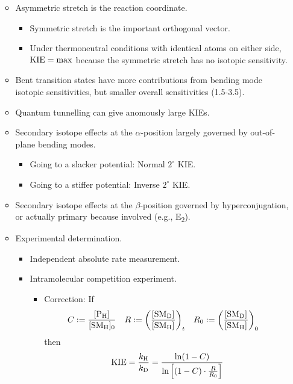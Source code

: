 \documentclass[../notes.tex]{subfiles}
\begin{document}
\begin{itemize}
\begin{itemize}
\begin{equation*}
        \end{equation*}
        \item Asymmetric stretch is the reaction coordinate.
        \begin{itemize}
            \item Symmetric stretch is the important orthogonal vector.
            \item Under thermoneutral conditions with identical atoms on either side, $\operatorname{KIE}=\max$ because the symmetric stretch has no isotopic sensitivity.
        \end{itemize}
        \item Bent transition states have more contributions from bending mode isotopic sensitivities, but smaller overall sensitivities (1.5-3.5).
        \item Quantum tunnelling can give anomously large KIEs.
        \item Secondary isotope effects at the $\alpha$-position largely governed by out-of-plane bending modes.
        \begin{itemize}
            \item Going to a slacker potential: Normal $2^\circ$ KIE.
            \item Going to a stiffer potential: Inverse $2^\circ$ KIE.
        \end{itemize}
        \item Secondary isotope effects at the $\beta$-position governed by hyperconjugation, or actually primary because involved (e.g., E\textsubscript{2}).
        \item Experimental determination.
        \begin{itemize}
            \item Independent absolute rate measurement.
            \item Intramolecular competition experiment.
            \begin{itemize}
                \item Correction: If
                \begin{align*}
                    C &:= \frac{\cnc{P_H}}{\cnc[0]{SM_H}}&
                    R &:= \left( \frac{\cnc{SM_D}}{\cnc{SM_H}} \right)_t&
                    R_0 &:= \left( \frac{\cnc{SM_D}}{\cnc{SM_H}} \right)_0
                \end{align*}
                then
                \begin{equation*}
                    \KIE = \frac{k_{\ce{H}}}{k_{\ce{D}}}
                    = \frac{\ln(1-C)}{\ln\left[ (1-C)\cdot\frac{R}{R_0} \right]}

\end{equation*}
\end{itemize}
\end{itemize}
\end{itemize}
\end{itemize}
\end{document}
